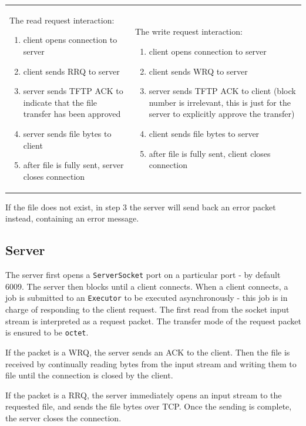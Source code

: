 \documentclass[a4paper]{article}
\newcommand{\code}{\texttt}
\begin{document}
\begin{tabular}{ p{} p{} }
The read request interaction:
\begin{enumerate}
\item client opens connection to server
\item client sends RRQ to server
\item server sends TFTP ACK to indicate that the file transfer has been approved
\item server sends file bytes to client
\item after file is fully sent, server closes connection 
\end{enumerate}
&
The write request interaction:
\begin{enumerate}
\item client opens connection to server
\item client sends WRQ to server
\item server sends TFTP ACK to client (block number is irrelevant, this is just for the server to explicitly approve the transfer)
\item client sends file bytes to server
\item after file is fully sent, client closes connection
\end{enumerate}
\\
\end{tabular}

If the file does not exist, in step 3 the server will send back an error packet instead, containing an error message.

\subsection{Server}

The server first opens a \code{ServerSocket} port on a particular port - by default 6009. The server then blocks until a client connects. When a client connects, a job is submitted to an \code{Executor} to be executed asynchronously - this job is in charge of responding to the client request. The first read from the socket input stream is interpreted as a request packet. The transfer mode of the request packet is ensured to be \code{octet}.

If the packet is a WRQ, the server sends an ACK to the client. Then the file is received by continually reading bytes from the input stream and writing them to file until the connection is closed by the client.

If the packet is a RRQ, the server immediately opens an input stream to the requested file, and sends the file bytes over TCP. Once the sending is complete, the server closes the connection.
\end{document}
